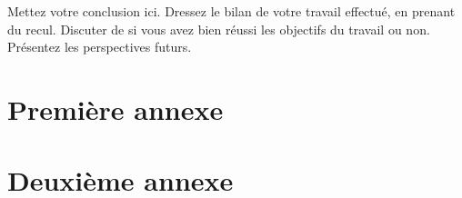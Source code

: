 \documentclass[12pt,a4paper,oneside, titlepage]{report}
\begin{document}
Mettez votre conclusion ici.  Dressez le bilan de votre travail effectué, en prenant du recul. Discuter de si vous avez bien réussi les objectifs du travail ou non. Présentez les perspectives futurs.






\newpage
\appendix
{}

\chapter{Premi\`ere annexe}
\renewcommand{\leftmark}{ANNEXE \thechapter.~~Premi\`ere annexe}
\label{annexe1}

\chapter{Deuxi\`eme annexe}
\renewcommand{\leftmark}{ANNEXE \thechapter.~~Deuxi\`eme annexe}
\label{annexe2}

\end{document}
